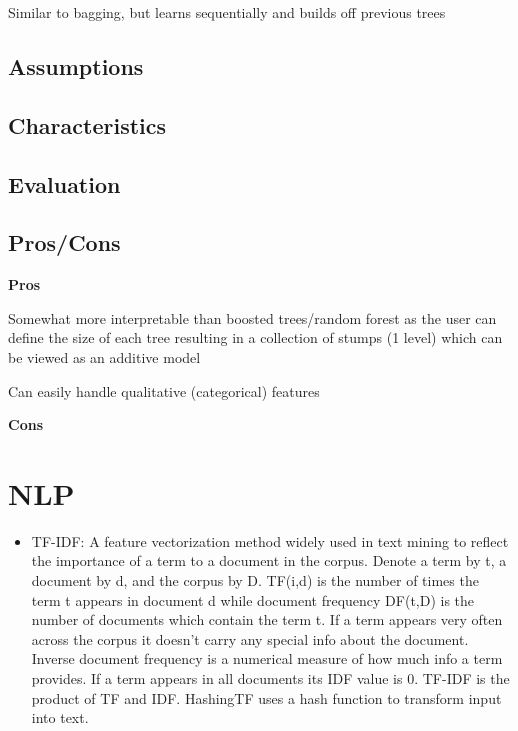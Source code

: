 \documentclass[]{book}
\providecommand{\tightlist}{%
  \setlength{\itemsep}{0pt}\setlength{\parskip}{0pt}}
\theoremstyle{definition}
\theoremstyle{definition}
\theoremstyle{definition}
\theoremstyle{remark}
\begin{document}
Similar to bagging, but learns sequentially and builds off previous
trees

\subsection{Assumptions}\label{assumptions-16}

\subsection{Characteristics}\label{characteristics-11}

\subsection{Evaluation}\label{evaluation-16}

\subsection{Pros/Cons}\label{proscons-16}

\textbf{Pros}

Somewhat more interpretable than boosted trees/random forest as the user
can define the size of each tree resulting in a collection of stumps (1
level) which can be viewed as an additive model

Can easily handle qualitative (categorical) features

\textbf{Cons}

\section{NLP}\label{nlp}

\begin{itemize}
\tightlist
\item
  TF-IDF: A feature vectorization method widely used in text mining to
  reflect the importance of a term to a document in the corpus. Denote a
  term by t, a document by d, and the corpus by D. TF(i,d) is the number
  of times the term t appears in document d while document frequency
  DF(t,D) is the number of documents which contain the term t. If a term
  appears very often across the corpus it doesn't carry any special info
  about the document. Inverse document frequency is a numerical measure
  of how much info a term provides. If a term appears in all documents
  its IDF value is 0. TF-IDF is the product of TF and IDF. HashingTF
  uses a hash function to transform input into text.
\end{itemize}
\end{document}
